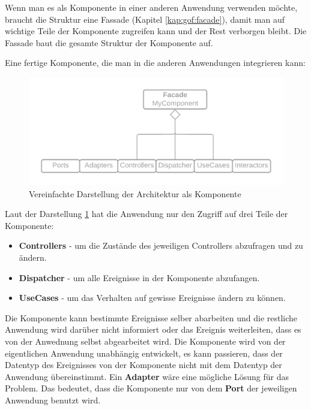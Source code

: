 \newpage
Wenn man es als Komponente in einer anderen Anwendung verwenden möchte, braucht die Struktur eine Fassade (Kapitel \ref{kap:gof:facade}), damit man 
auf wichtige Teile der Komponente zugreifen kann und der Rest verborgen bleibt. 
Die Fassade baut die gesamte Struktur der Komponente auf.

Eine fertige Komponente, die man in die anderen Anwendungen integrieren kann:

\begin{figure}[H]
    \centering
    \includegraphics[width=1\textwidth]{./images/Architecture as Facade.png}
    \caption{Vereinfachte Darstellung der Architektur als Komponente}
    \label{fig:SimpliedArchitectureAsKomponent}
\end{figure}

Laut der Darstellung \ref{fig:SimpliedArchitectureAsKomponent} hat die Anwendung nur den Zugriff auf drei Teile der Komponente:
\begin{itemize}
    \item \textbf{Controllers} - um die Zustände des jeweiligen Controllers abzufragen und zu ändern.
    \item \textbf{Dispatcher} - um alle Ereignisse in der Komponente abzufangen.
    \item \textbf{UseCases} - um das Verhalten auf gewisse Ereignisse ändern zu können.
\end{itemize}

Die Komponente kann bestimmte Ereignisse selber abarbeiten und die restliche Anwendung wird darüber nicht informiert oder
das Ereignis weiterleiten, dass es von der Anwednung selbst abgearbeitet wird.
Die Komponente wird von der eigentlichen Anwendung unabhängig entwickelt, es kann passieren, dass
der Datentyp des Ereignisses von der Komponente nicht mit dem Datentyp der Anwendung übereinstimmt. 
Ein \textbf{Adapter} wäre eine mögliche Lösung für das Problem.
Das bedeutet, dass die Komponente nur von dem \textbf{Port} der jeweiligen Anwendung benutzt wird.

